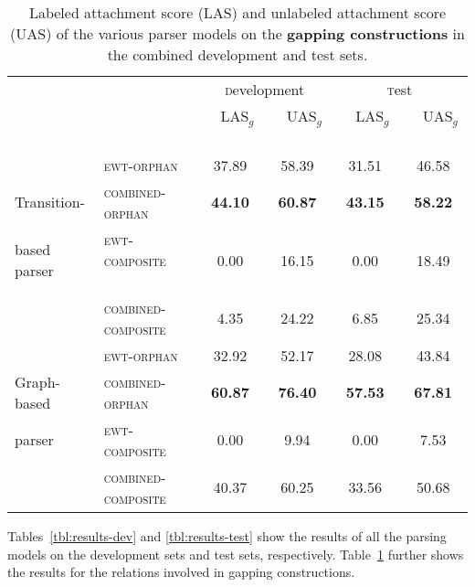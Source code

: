\documentclass[lucida,biblatex]{sp} %
\begin{document}
\begin{table}
\footnotesize
\begin{tabularx}{\textwidth}{l| l |  c c   | c c   }
&	&				 	\multicolumn{2}{c|}{\small \textsc development}	&		\multicolumn{2}{c}{\small \textsc test}			\\
&	&					\ \ LAS$_g$\ \ & \ \	UAS$_g$ \ \ &	\ \ 	LAS$_g$ \ \ & \ \ 	UAS$_g$ \ \ 			\\ \midrule
 & \textsc{ewt-orphan} 			&		37.89&		58.39&		31.51		&46.58		\\
Transition- & \textsc{combined-orphan}	&		{\bf \color{blue} 44.10}&		{\bf \color{blue} 60.87}&		{\bf \color{blue} 43.15}		&{\bf \color{blue} 58.22}		\\
based parser & \textsc{ewt-composite} \ \ \ \  	&		0.00&		16.15&		0.00 		&18.49		\\
& \textsc{combined-composite}		&		4.35&		24.22&		6.85 		&25.34		\\\midrule
&	\textsc{ewt-orphan} 	&				32.92&		52.17&		28.08		&43.84		\\
Graph-based &	\textsc{combined-orphan}&						{\bf 60.87}&	{\bf 76.40}&	{\bf 57.53}	&{\bf 67.81}	\\
parser &	\textsc{ewt-composite} 	&					0.00&		9.94&		0.00 		&7.53		\\
&	\textsc{combined-composite}&					40.37&		60.25&		33.56		&50.68		\\
\end{tabularx}
\caption{Labeled attachment score (LAS) and unlabeled attachment score (UAS) of the various parser models on the {\bf gapping constructions} in the  {\sc combined} development and test sets.}  \label{tbl:results-gapping}
\end{table}


Tables~\ref{tbl:results-dev} and \ref{tbl:results-test} show the results of all the parsing models on the development sets and test sets, respectively. Table~\ref{tbl:results-gapping} further shows the results for the relations involved in gapping constructions. 
\end{document}

